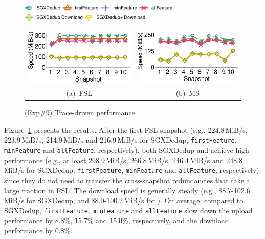 \begin{figure}[t]
    \centering
    \includegraphics[height=0.15in]{pic/featurespy/plot/performance/LANTrace/trace_legend_upload.pdf}\\
    \includegraphics[height=0.15in]{pic/featurespy/plot/performance/LANTrace/trace_legend_download.pdf}\\
    \vspace{3pt}
    \begin{tabular}{@{\ }c@{\ }c}
        \includegraphics[height=.82in]{pic/featurespy/plot/performance/LANTrace/trace_fsl.pdf}&
        \includegraphics[height=.82in]{pic/featurespy/plot/performance/LANTrace/trace_ms.pdf}\\
        \mbox{\small (a) FSL} &
        \mbox{\small (b) MS}\\
    \end{tabular}
    \vspace{-6pt}
    \caption{(Exp\#9) Trace-driven performance.}
    \vspace{-6pt}
    \label{fig:traceDrivenThroughput}
\end{figure}

Figure~\ref{fig:traceDrivenThroughput} presents the results. After the first FSL snapshot (e.g., 224.8\,MiB/s, 223.9\,MiB/s, 214.9\,MiB/s and 216.9\,MiB/s for SGXDedup, {\tt firstFeature}, {\tt minFeature} and {\tt allFeature}, respectively), both SGXDedup and \prototype achieve high performance (e.g., at least 298.9\,MiB/s, 266.8\,MiB/s, 246.4\,MiB/s  and 248.8\,MiB/s for SGXDedup, {\tt firstFeature}, {\tt minFeature} and {\tt allFeature}, respectively), since they do not need to transfer the cross-snapshot redundancies that take a large fraction in FSL. The download speed is generally steady (e.g., 88.7-102.6\,MiB/s for SGXDedup,  and 88.0-100.2\,MiB/s for \prototype). On average, compared to SGXDedup, {\tt firstFeature}, {\tt minFeature} and {\tt allFeature} slow down the upload performance by 8.8\%, 15.7\% and 15.0\%, respectively, and the download performance by 0.8\%.

